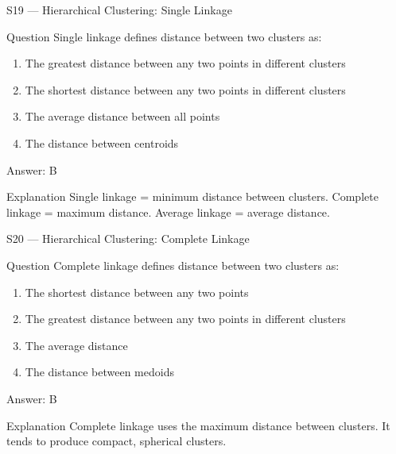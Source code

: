 \documentclass[aspectratio=169,8pt]{beamer}
\begin{document}
	\begin{frame}{S19 --- Hierarchical Clustering: Single Linkage}
		\begin{block}{Question}
			Single linkage defines distance between two clusters as:
			\begin{enumerate}
				\item The greatest distance between any two points in different clusters
				\item The shortest distance between any two points in different clusters
				\item The average distance between all points
				\item The distance between centroids
			\end{enumerate}
		\end{block}
		\begin{exampleblock}{Answer: B}\end{exampleblock}
		\begin{block}{Explanation}
			Single linkage = minimum distance between clusters. Complete linkage = maximum distance. Average linkage = average distance.
		\end{block}
	\end{frame}
	
	\begin{frame}{S20 --- Hierarchical Clustering: Complete Linkage}
		\begin{block}{Question}
			Complete linkage defines distance between two clusters as:
			\begin{enumerate}
				\item The shortest distance between any two points
				\item The greatest distance between any two points in different clusters
				\item The average distance
				\item The distance between medoids
			\end{enumerate}
		\end{block}
		\begin{exampleblock}{Answer: B}\end{exampleblock}
		\begin{block}{Explanation}
			Complete linkage uses the maximum distance between clusters. It tends to produce compact, spherical clusters.
		\end{block}
	\end{frame}
	
\end{document}
